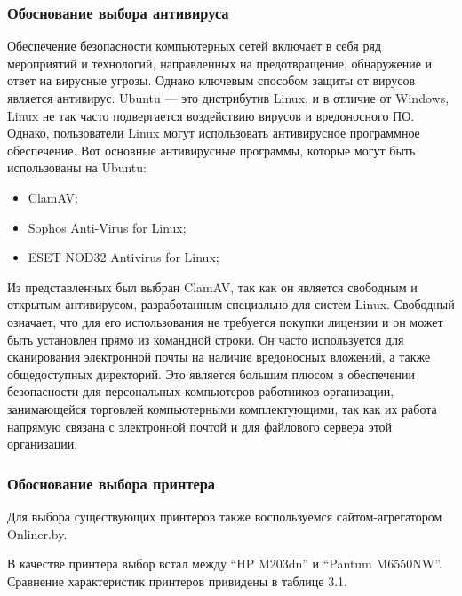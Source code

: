 \subsubsection{Обоснование выбора антивируса}\label{subsubsec:func:Antivirus}
Обеспечение безопасности компьютерных сетей включает в себя ряд мероприятий и технологий,
направленных на предотвращение, обнаружение и ответ на вирусные угрозы.
Однако ключевым способом защиты от вирусов является антивирус.
Ubuntu — это дистрибутив Linux, и в отличие от Windows, Linux не так часто подвергается воздействию вирусов и вредоносного ПО.
Однако, пользователи Linux могут использовать антивирусное программное обеспечение.
Вот основные антивирусные программы, которые могут быть использованы на Ubuntu:
\begin{itemize}
    \item ClamAV;
    \item Sophos Anti-Virus for Linux;
    \item ESET NOD32 Antivirus for Linux;
\end{itemize}
Из представленных был выбран ClamAV, так как он является свободным и открытым антивирусом, разработанным специально для систем Linux.
Свободный означает, что для его использования не требуется покупки лицензии и он может быть установлен прямо из командной строки.
Он часто используется для сканирования электронной почты на наличие вредоносных вложений, а также общедоступных директорий.
Это является большим плюсом в обеспечении безопасности для персональных компьютеров работников организации,
занимающейся торговлей компьютерными комплектующими, так как их работа напрямую связана с электронной почтой и для файлового сервера этой организации.

\subsubsection{Обоснование выбора принтера}\label{subsubsec:func:PrinterChoice}
    Для выбора существующих принтеров также воспользуемся сайтом-агрегатором Onliner.by.

    В качестве принтера выбор встал между “HP M203dn” и “Pantum M6550NW”.
    Сравнение характеристик принтеров привидены в таблице 3.1.

